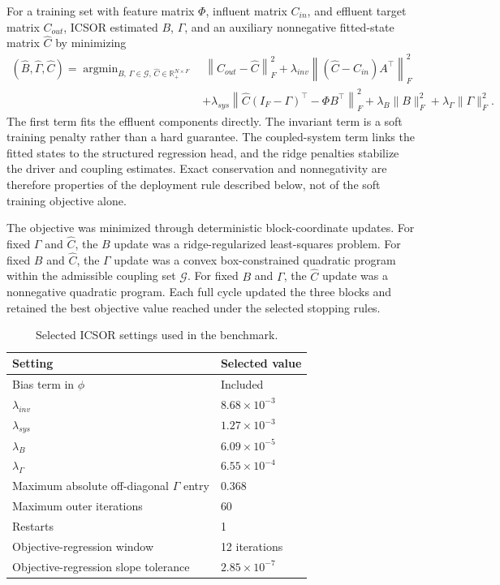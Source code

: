 \documentclass[12pt, twoside]{book}
\DeclareMathOperator*{\argmin}{argmin}
\begin{document}
For a training set with feature matrix \(\Phi\), influent matrix \(C_{in}\), and effluent target matrix
\(C_{out}\), ICSOR estimated \(B\), \(\Gamma\), and an auxiliary nonnegative fitted-state matrix
\(\widehat{C}\) by minimizing
\begin{equation}
\label{eq:ch3_training_objective}
\begin{aligned}
(\widehat{B},\widehat{\Gamma},\widehat{C})
=\argmin_{B,\,\Gamma\in\mathcal{G},\,\widehat{C}\in\mathbb{R}_{+}^{N\times F}}
&\ \left\|C_{out}-\widehat{C}\right\|_{F}^{2}
+\lambda_{inv}\left\|(\widehat{C}-C_{in})A^\top\right\|_{F}^{2}\\
&+\lambda_{sys}\left\|\widehat{C}(I_F-\Gamma)^\top-\Phi B^\top\right\|_{F}^{2}
+\lambda_B\|B\|_{F}^{2}
+\lambda_{\Gamma}\|\Gamma\|_{F}^{2}.
\end{aligned}
\end{equation}
The first term fits the effluent components directly. The invariant term is a soft training penalty rather
than a hard guarantee. The coupled-system term links the fitted states to the structured regression head, and
the ridge penalties stabilize the driver and coupling estimates. Exact conservation and nonnegativity are
therefore properties of the deployment rule described below, not of the soft training objective alone.

The objective was minimized through deterministic block-coordinate updates. For fixed \(\Gamma\) and
\(\widehat{C}\), the \(B\) update was a ridge-regularized least-squares problem. For fixed \(B\) and
\(\widehat{C}\), the \(\Gamma\) update was a convex box-constrained quadratic program within the admissible
coupling set \(\mathcal{G}\). For fixed \(B\) and \(\Gamma\), the \(\widehat{C}\) update was a nonnegative
quadratic program. Each full cycle updated the three blocks and retained the best objective value reached
under the selected stopping rules.

\begin{table}[htbp]
\centering
\caption{Selected ICSOR settings used in the benchmark.}
\label{tab:ch3_icsor_settings}
\scriptsize
\setlength{\tabcolsep}{6pt}
\begin{tabular}{ll}
\toprule
Setting & Selected value \\
\midrule
Bias term in \(\phi\) & Included \\
\(\lambda_{inv}\) & \(8.68\times10^{-3}\) \\
\(\lambda_{sys}\) & \(1.27\times10^{-3}\) \\
\(\lambda_B\) & \(6.09\times10^{-5}\) \\
\(\lambda_{\Gamma}\) & \(6.55\times10^{-4}\) \\
Maximum absolute off-diagonal \(\Gamma\) entry & 0.368 \\
Maximum outer iterations & 60 \\
Restarts & 1 \\
Objective-regression window & 12 iterations \\
Objective-regression slope tolerance & \(2.85\times10^{-7}\) \\
\bottomrule
\end{tabular}
\end{table}
\end{document}
